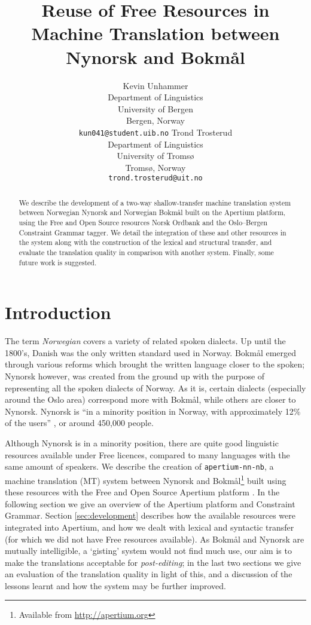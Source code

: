 \documentclass[11pt]{article}
\author{Kevin Unhammer\\  Department of Linguistics \\ University of Bergen \\  Bergen, Norway \\  {\tt \small   kun041@student.uib.no} \And  Trond Trosterud \\  Department of Linguistics \\  University of Tromsø \\  Tromsø, Norway \\    {\tt \small  trond.trosterud@uit.no}}
\title{Reuse of Free Resources in Machine Translation between Nynorsk and Bokmål}
\begin{document}
\maketitle

  \begin{abstract}
    We describe the development of a two-way shallow-transfer machine
    translation system between Norwegian Nynorsk and Norwegian Bokmål
    built on the Apertium platform, using the Free and Open Source
    resources Norsk Ordbank and the Oslo–Bergen Constraint Grammar
    tagger. We detail the integration of these and other resources in
    the system along with the construction of the lexical and
    structural transfer, and evaluate the translation quality in
    comparison with another system. Finally, some future work is
    suggested.
  \end{abstract}

\section{Introduction}
The term \emph{Norwegian} covers a variety of related spoken dialects.
Up until the 1800's, Danish was the only written standard used in
Norway. Bokmål emerged through various reforms which brought the
written language closer to the spoken; Nynorsk however, was created
from the ground up with the purpose of representing all the spoken
dialects of Norway. As it is, certain dialects (especially around the
Oslo area) correspond more with Bokmål, while others are closer to
Nynorsk. Nynorsk is ``in a minority position in Norway, with
approximately 12\% of the users'' \citep{everson2000sln}, or around
450,000 people.

Although Nynorsk is in a minority position, there are quite good
linguistic resources available under Free licences, compared to many
languages with the same amount of speakers. We describe the creation
of {\tt \small apertium-nn-nb}, a machine translation (MT) system
between Nynorsk and Bokmål\footnote{Available from
  \href{http://apertium.org}{http://apertium.org} } built using these
resources with the Free and Open Source Apertium platform
\citep{armentano2006ops}. In the following section we give an overview
of the Apertium platform and Constraint Grammar. Section
\ref{sec:development} describes how the available resources were
integrated into Apertium, and how we dealt with lexical and syntactic
transfer (for which we did not have Free resources available). As
Bokmål and Nynorsk are mutually intelligible, a `gisting' system would
not find much use, our aim is to make the translations acceptable for
\emph{post-editing}; in the last two sections we give an evaluation of
the translation quality in light of this, and a discussion of the
lessons learnt and how the system may be further improved.
\end{document}
